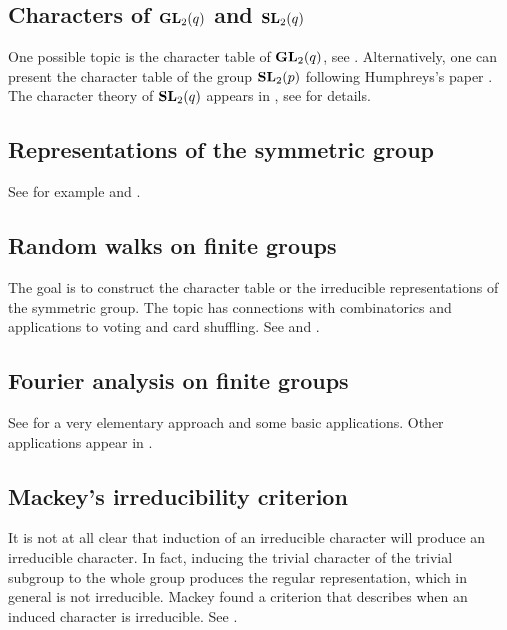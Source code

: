 \subsection*{Characters of $\mathbf{GL}_2(q)$ and $\mathbf{SL}_2(q)$}

One possible topic is the character table of $\mathbf{GL}_2(q)$, see
\cite[\S5.2]{MR2867444}. Alternatively, one can 
present the character table of the group $\mathbf{SL}_2(p)$  
following Humphreys's paper \cite{MR364478}. 
The character theory of $\mathbf{SL}_2(q)$ appears in 
\cite[\S5.2]{MR2867444}, see 
\cite[Chapter 20]{MR1650707} for details. 

\subsection*{Representations of the symmetric group}

See for example \cite[\S10]{MR2867444} and 
\cite{MR1153249}. 

\subsection*{Random walks on finite groups}

The goal is to construct the character table or 
the irreducible representations of the symmetric group. 
The topic has connections with combinatorics and applications 
to voting and card shuffling. 
See \cite[4]{MR1153249} and \cite[\S11]{MR2867444}.

\subsection*{Fourier analysis on finite groups}

See \cite[\S5]{MR2867444} for a very elementary approach and some
basic applications. Other applications 
appear in \cite{MR1695775}.

\subsection*{Mackey's irreducibility criterion}

It is not at all clear that 
induction of an irreducible character will produce an irreducible character. In fact, 
inducing the trivial character of the trivial subgroup to the whole group produces the 
regular representation, which in general is not irreducible. Mackey found a criterion 
that describes when an induced character is irreducible. See \cite[\S8.3]{MR2867444}. 

